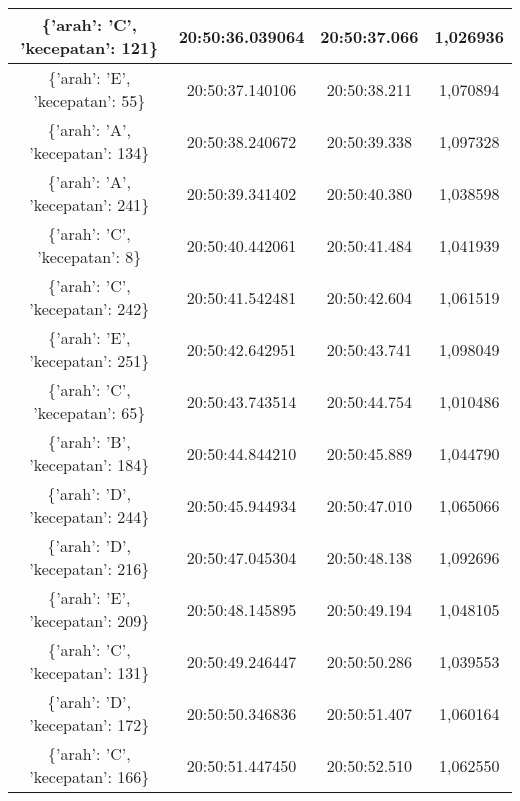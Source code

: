 \begin{table}[H]
\begin{tabular}{|ccc|c|}
    \multicolumn{1}{|c|}{\{'arah': 'C', 'kecepatan': 121\}} & \multicolumn{1}{c|}{20:50:36.039064} & 20:50:37.066       & 1,026936    \\ \hline
    \multicolumn{1}{|c|}{\{'arah': 'E', 'kecepatan': 55\}}  & \multicolumn{1}{c|}{20:50:37.140106} & 20:50:38.211       & 1,070894    \\ \hline
    \multicolumn{1}{|c|}{\{'arah': 'A', 'kecepatan': 134\}} & \multicolumn{1}{c|}{20:50:38.240672} & 20:50:39.338       & 1,097328    \\ \hline
    \multicolumn{1}{|c|}{\{'arah': 'A', 'kecepatan': 241\}} & \multicolumn{1}{c|}{20:50:39.341402} & 20:50:40.380       & 1,038598    \\ \hline
    \multicolumn{1}{|c|}{\{'arah': 'C', 'kecepatan': 8\}}   & \multicolumn{1}{c|}{20:50:40.442061} & 20:50:41.484       & 1,041939    \\ \hline
    \multicolumn{1}{|c|}{\{'arah': 'C', 'kecepatan': 242\}} & \multicolumn{1}{c|}{20:50:41.542481} & 20:50:42.604       & 1,061519    \\ \hline
    \multicolumn{1}{|c|}{\{'arah': 'E', 'kecepatan': 251\}} & \multicolumn{1}{c|}{20:50:42.642951} & 20:50:43.741       & 1,098049    \\ \hline
    \multicolumn{1}{|c|}{\{'arah': 'C', 'kecepatan': 65\}}  & \multicolumn{1}{c|}{20:50:43.743514} & 20:50:44.754       & 1,010486    \\ \hline
    \multicolumn{1}{|c|}{\{'arah': 'B', 'kecepatan': 184\}} & \multicolumn{1}{c|}{20:50:44.844210} & 20:50:45.889       & 1,044790    \\ \hline
    \multicolumn{1}{|c|}{\{'arah': 'D', 'kecepatan': 244\}} & \multicolumn{1}{c|}{20:50:45.944934} & 20:50:47.010       & 1,065066    \\ \hline
    \multicolumn{1}{|c|}{\{'arah': 'D', 'kecepatan': 216\}} & \multicolumn{1}{c|}{20:50:47.045304} & 20:50:48.138       & 1,092696    \\ \hline
    \multicolumn{1}{|c|}{\{'arah': 'E', 'kecepatan': 209\}} & \multicolumn{1}{c|}{20:50:48.145895} & 20:50:49.194       & 1,048105    \\ \hline
    \multicolumn{1}{|c|}{\{'arah': 'C', 'kecepatan': 131\}} & \multicolumn{1}{c|}{20:50:49.246447} & 20:50:50.286       & 1,039553    \\ \hline
    \multicolumn{1}{|c|}{\{'arah': 'D', 'kecepatan': 172\}} & \multicolumn{1}{c|}{20:50:50.346836} & 20:50:51.407       & 1,060164    \\ \hline
    \multicolumn{1}{|c|}{\{'arah': 'C', 'kecepatan': 166\}} & \multicolumn{1}{c|}{20:50:51.447450} & 20:50:52.510       & 1,062550    \\ \hline

\end{tabular}
\end{table}
